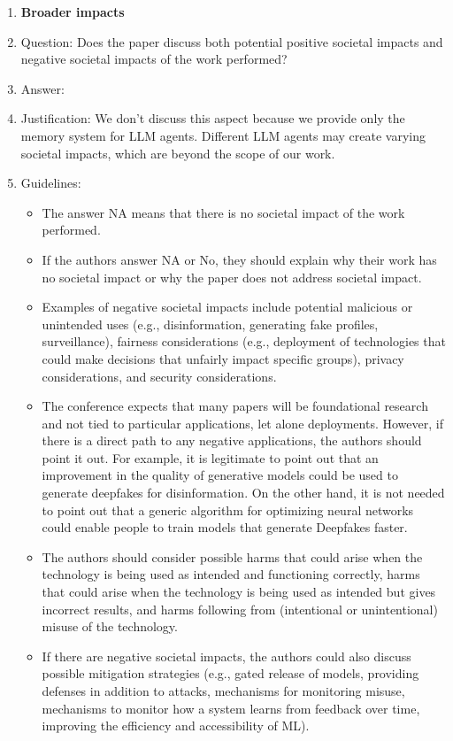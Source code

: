 \documentclass{article}
\begin{document}
\begin{enumerate}
\item {\bf Broader impacts}
    \item[] Question: Does the paper discuss both potential positive societal impacts and negative societal impacts of the work performed?
    \item[] Answer: \answerNo{} %
    \item[] Justification: We don't discuss this aspect because we provide only the memory system for LLM agents. Different LLM agents may create varying societal impacts, which are beyond the scope of our work.
    \item[] Guidelines:
    \begin{itemize}
        \item The answer NA means that there is no societal impact of the work performed.
        \item If the authors answer NA or No, they should explain why their work has no societal impact or why the paper does not address societal impact.
        \item Examples of negative societal impacts include potential malicious or unintended uses (e.g., disinformation, generating fake profiles, surveillance), fairness considerations (e.g., deployment of technologies that could make decisions that unfairly impact specific groups), privacy considerations, and security considerations.
        \item The conference expects that many papers will be foundational research and not tied to particular applications, let alone deployments. However, if there is a direct path to any negative applications, the authors should point it out. For example, it is legitimate to point out that an improvement in the quality of generative models could be used to generate deepfakes for disinformation. On the other hand, it is not needed to point out that a generic algorithm for optimizing neural networks could enable people to train models that generate Deepfakes faster.
        \item The authors should consider possible harms that could arise when the technology is being used as intended and functioning correctly, harms that could arise when the technology is being used as intended but gives incorrect results, and harms following from (intentional or unintentional) misuse of the technology.
        \item If there are negative societal impacts, the authors could also discuss possible mitigation strategies (e.g., gated release of models, providing defenses in addition to attacks, mechanisms for monitoring misuse, mechanisms to monitor how a system learns from feedback over time, improving the efficiency and accessibility of ML).
    \end{itemize}
    

\end{enumerate}
\end{document}

